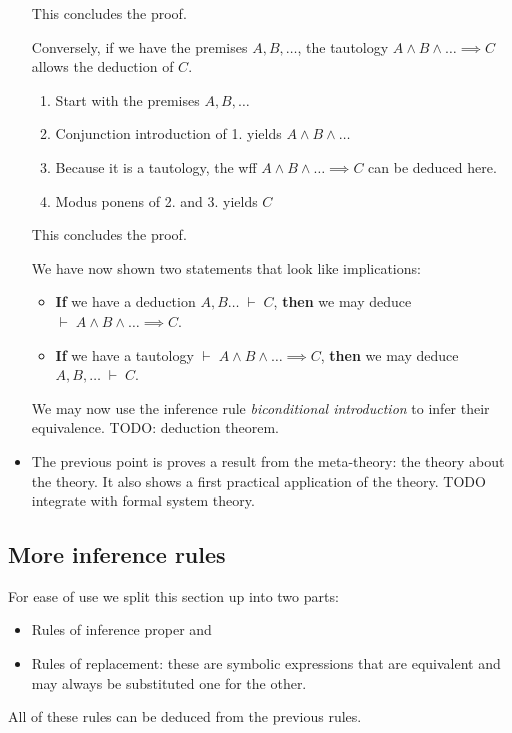 \begin{itemize}
\begin{note}
\begin{enumerate}
\end{enumerate}
This concludes the proof.
\end{note}
Conversely, if we have the premises $A, B ,\ldots$, the tautology $A \land B \land\ldots \implies C$ allows the deduction of $C$.
\begin{note}
\begin{enumerate}
\item Start with the premises $A, B ,\ldots$
\item Conjunction introduction of 1. yields $A \land B \land\ldots$
\item Because it is a tautology, the wff $A \land B \land\ldots \implies C$ can be deduced here.
\item Modus ponens of 2. and 3. yields $C$
\end{enumerate}
This concludes the proof.
\end{note}
We have now shown two statements that look like implications:
\begin{itemize}
\item \textbf{If} we have a deduction $A, B \ldots \;\vdash\; C$,
\textbf{then} we may deduce $\vdash\; A \land B \land\ldots \implies C$.
\item \textbf{If} we have a tautology $\vdash\; A \land B \land\ldots \implies C$,
\textbf{then} we may deduce $A, B ,\ldots \;\vdash\; C$.
\end{itemize}
We may now use the inference rule \textit{biconditional introduction} to infer their equivalence. TODO: deduction theorem.
\item The previous point is proves a result from the meta-theory: the theory about the theory. It also shows a first practical application of the theory. TODO integrate with formal system theory.
\end{itemize}

\subsection{More inference rules}
For ease of use we split this section up into two parts:
\begin{itemize}
\item Rules of inference proper and
\item Rules of replacement: these are symbolic expressions that are equivalent and may always be substituted one for the other.
\end{itemize}
All of these rules can be deduced from the previous rules.
